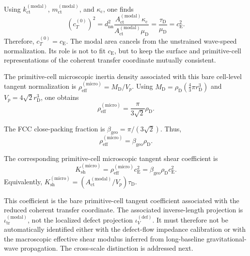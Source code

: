 Using $k_{\mathrm{ct}}^{(\mathrm{modal})}$, $m_{\mathrm{ct}}^{(\mathrm{modal})}$, and $\kappa_{\mathrm{c}}$, one finds
\begin{equation}
    (c_T^{(0)})^2 = d_{\mathrm{nn}}^2 \frac{ A_{\mathrm{ct}}^{(\mathrm{modal})}\kappa_{\mathrm{c}} }{ A_{\mathrm{ct}}^{(\mathrm{modal})}\mu_{\mathrm{D}} } = \frac{\tau_{\mathrm{D}}}{\mu_{\mathrm{D}}} = c_{\mathrm{E}}^2.
\end{equation}
Therefore, $c_T^{(0)}=c_{\mathrm{E}}$. The modal area cancels from the unstrained wave-speed normalization. Its role is not to fit $c_{\mathrm{E}}$, but to keep the surface and primitive-cell representations of the coherent transfer coordinate mutually consistent.

The primitive-cell microscopic inertia density associated with this bare cell-level tangent normalization is $\rho_{\mathrm{eff}}^{(\mathrm{micro})} = M_{\mathrm{D}} / V_p$. Using $M_{\mathrm{D}} = \rho_{\mathrm{D}} \left(\frac{4}{3}\pi r_{\mathrm{D}}^3\right)$ and $V_p=4\sqrt{2}r_{\mathrm{D}}^3$, one obtains
\begin{equation}
    \rho_{\mathrm{eff}}^{(\mathrm{micro})} = \frac{\pi}{3\sqrt{2}}\rho_{\mathrm{D}}.
\end{equation}

The FCC close-packing fraction is $\beta_{\mathrm{geo}} = \pi / (3\sqrt{2})$. Thus,
\begin{equation}
    \boxed{ \rho_{\mathrm{eff}}^{(\mathrm{micro})} = \beta_{\mathrm{geo}}\rho_{\mathrm{D}} }.
\end{equation}

The corresponding primitive-cell microscopic tangent shear coefficient is
\begin{equation}
    \boxed{ K_{\mathrm{sh}}^{(\mathrm{micro})} = \rho_{\mathrm{eff}}^{(\mathrm{micro})}c_{\mathrm{E}}^2 = \beta_{\mathrm{geo}}\rho_{\mathrm{D}}c_{\mathrm{E}}^2 }.
\end{equation}
Equivalently, $K_{\mathrm{sh}}^{(\mathrm{micro})} = (A_{\mathrm{ct}}^{(\mathrm{modal})} / V_p) \tau_{\mathrm{D}}$.

This coefficient is the bare primitive-cell tangent coefficient associated with the reduced coherent transfer coordinate. The associated inverse-length projection is \(\iota_{\mathrm{tr}}^{(\mathrm{modal})}\), not the localized defect projection \(\iota_V^{(\mathrm{def})}\). It must therefore not be automatically identified either with the defect-flow impedance calibration or with the macroscopic effective shear modulus inferred from long-baseline gravitational-wave propagation. The cross-scale distinction is addressed next.

